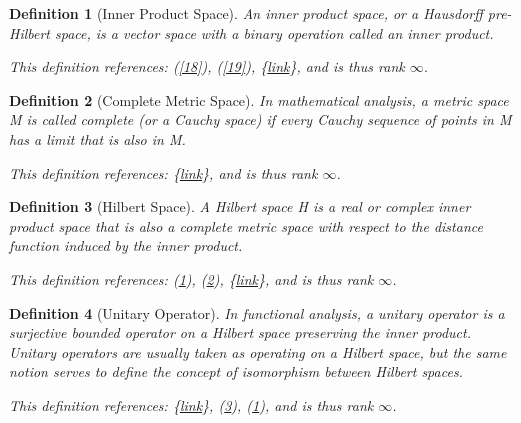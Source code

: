 \documentclass{article}
\newtheorem{definition}{Definition}
\newtheorem{External Info}[definition]{External Info}
\begin{document}
\begin{tcolorbox}[title=Definition: Inner Product Space]\begin{definition}[Inner Product Space]\label{20}An inner product space, or a Hausdorff pre-Hilbert space, is a vector space with a binary operation called an inner product.
 
 This definition references: (\ref{18}), (\ref{19}), \{\href{https://en.wikipedia.org/wiki/Inner_product_space}{link}\}, and is thus rank $\infty$.\end{definition}\end{tcolorbox}
\begin{tcolorbox}[title=Definition: Complete Metric Space]\begin{definition}[Complete Metric Space]\label{21}In mathematical analysis, a metric space M is called complete (or a Cauchy space) if every Cauchy sequence of points in M has a limit that is also in M.
 
 This definition references: \{\href{https://en.wikipedia.org/wiki/Complete_metric_space}{link}\}, and is thus rank $\infty$.\end{definition}\end{tcolorbox}
\begin{tcolorbox}[title=Definition: Hilbert Space]\begin{definition}[Hilbert Space]\label{22}A Hilbert space H is a real or complex inner product space that is also a complete metric space with respect to the distance function induced by the inner product.
 
 This definition references: (\ref{20}), (\ref{21}), \{\href{https://en.wikipedia.org/wiki/Hilbert_space#Definition_and_illustration}{link}\}, and is thus rank $\infty$.\end{definition}\end{tcolorbox}
\begin{tcolorbox}[title=Definition: Unitary Operator]\begin{definition}[Unitary Operator]\label{23}In functional analysis, a unitary operator is a surjective bounded operator on a Hilbert space preserving the inner product. Unitary operators are usually taken as operating on a Hilbert space, but the same notion serves to define the concept of isomorphism between Hilbert spaces.
 
 This definition references: \{\href{https://en.wikipedia.org/wiki/Unitary_operator}{link}\}, (\ref{22}), (\ref{20}), and is thus rank $\infty$.\end{definition}\end{tcolorbox}
\end{document}
